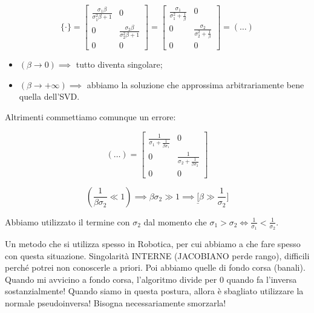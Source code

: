 \[
	\{\mathord{\cdot}\} = \begin{bmatrix}\frac{\sigma_1\beta}{\sigma_1^2\beta+1}&0\\0&\frac{\sigma_2\beta}{\sigma_2^2\beta+1}\\0&0\end{bmatrix} = \begin{bmatrix}\frac{\sigma_1}{\sigma_1^2+\frac{1}{\beta}}&0\\0&\frac{\sigma_2}{\sigma_2^2+\frac{1}{\beta}}\\0&0\end{bmatrix} = (\dots)
\]

\begin{itemize}

\item{$(\beta\to 0)\implies$} tutto diventa singolare;
\item{$(\beta\to+\infty)\implies$} abbiamo la soluzione che approssima arbitrariamente bene quella dell'SVD.
\end{itemize}

Altrimenti commettiamo comunque un errore:

\[
	(\dots) = \begin{bmatrix}\frac{1}{\sigma_1+\frac{1}{\beta\sigma_1}}&0\\0&\frac{1}{\sigma_2+\frac{1}{\beta\sigma_2}}\\0&0\end{bmatrix}
\]

\[
	(\frac{1}{\beta\sigma_2}\ll 1)\implies \beta\sigma_2\gg 1\implies \underline[\beta\gg \frac{1}{\sigma_2}]
\]

Abbiamo utilizzato il termine con $\sigma_2$ dal momento che $\sigma_1>\sigma_2 \iff \frac{1}{\sigma_1}<\frac{1}{\sigma_2}$.

Un metodo che si utilizza spesso in Robotica, per cui abbiamo a che fare spesso con questa situazione. Singolarità INTERNE (JACOBIANO perde rango), difficili perché potrei non conoscerle a priori. Poi abbiamo quelle di fondo corsa (banali). Quando mi avvicino a fondo corsa, l'algoritmo divide per 0 quando fa l'inversa sostanzialmente! Quando siamo in questa postura, allora è sbagliato utilizzare la normale pseudoinversa! Bisogna necessariamente smorzarla!